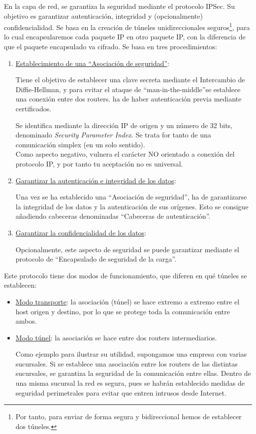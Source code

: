 En la capa de red, se garantiza la seguridad mediante el protocolo \acrfull{IPSec}. Su objetivo es garantizar autenticación, integridad y (opcionalmente) confidencialidad. Se basa en la creación de túneles unidireccionales seguros\footnote{Por tanto, para enviar de forma segura y bidireccional hemos de establecer dos túneles.}, para lo cual encapsularemos cada paquete \acrshort{IP} en otro paquete \acrshort{IP}, con la diferencia de que el paquete encapsulado va cifrado. Se basa en tres procedimientos:
\begin{enumerate}
    \item \ul{Establecimiento de una ``Asociación de seguridad''}:
    
    Tiene el objetivo de establecer una clave secreta mediante el Intercambio de Diffie-Hellman, y para evitar el ataque de ``man-in-the-middle''se establece una conexión entre dos routers. ha de haber autenticación previa mediante certificados.

    Se identifica mediante la dirección IP de origen y un número de 32 bits, denominado \emph{Security Parameter Index}. Se trata for tanto de una comunicación simplex (en un solo sentido).\\

    Como aspecto negativo, vulnera el carácter NO orientado a conexión del protocolo \acrshort{IP}, y por tanto tu aceptación no es universal.

    \item \ul{Garantizar la autenticación e integridad de los datos}:
    
    Una vez se ha establecido una ``Asociación de seguridad'', ha de garantizarse la integridad de los datos y la autenticación de sus orígenes. Esto se consigue añadiendo cabeceras denominadas ``Cabeceras de autenticación''.
    \item \ul{Garantizar la confidencialidad de los datos}:
    
    Opcionalmente, este aspecto de seguridad se puede garantizar mediante el protocolo de ``Encapsulado de seguridad de la carga''.
\end{enumerate}

Este protocolo tiene dos modos de funcionamiento, que diferen en qué túneles se establecen:
\begin{itemize}
    \item \ul{Modo transporte}: la asociación (túnel) se hace extremo a extremo entre el host origen y destino, por lo que se protege toda la comunicación entre ambos.
    \item \ul{Modo túnel}: la asociación se hace entre dos routers intermediarios.
    
    Como ejemplo para ilustrar su utilidad, supongamos una empresa con varias sucursales. Si se establece una asociación entre los routers de las distintas sucursales, se garantiza la seguridad de la comunicación entre ellas. Dentro de una misma sucursal la red es segura, pues se habrán establecido medidas de seguridad perimetrales para evitar que entren intrusos desde Internet.
\end{itemize}


